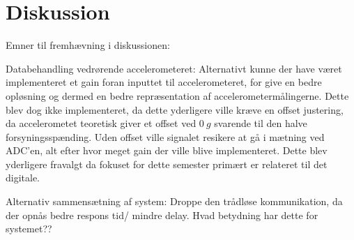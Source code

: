 \section{Diskussion}
Emner til fremhævning i diskussionen:


Databehandling vedrørende accelerometeret:
Alternativt kunne der have været implementeret et gain foran inputtet til accelerometeret, for give en bedre opløsning og dermed en bedre repræsentation af accelerometermålingerne. Dette blev dog ikke implementeret, da dette yderligere ville kræve en offset justering, da accelerometet teoretisk giver et offset ved $0~g$ svarende til den halve forsyningsspænding. Uden offset ville signalet resikere at gå i mætning ved ADC'en, alt efter hvor meget gain der ville blive implementeret. Dette blev yderligere fravalgt da fokuset for dette semester primært er relateret til det digitale.   




Alternativ sammensætning af system:
Droppe den trådløse kommunikation, da der opnås bedre respons tid/ mindre delay. Hvad betydning har dette for systemet?? 